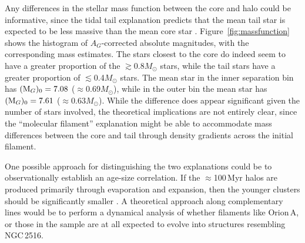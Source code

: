 \documentclass[12pt,twocolumn,tighten]{aastex63}
\newcommand{\cn}{NGC\,2516} %
\begin{document}
Any differences in the stellar mass function between the core and halo
could be informative, since the tidal tail explanation predicts that
the mean tail star is expected to be less massive than the mean core
star \citep[{\it e.g.},][]{chumak_tails_2006}.
Figure~\ref{fig:massfunction} shows the histogram of $A_G$-corrected
absolute magnitudes, with the corresponding
\citet{pecaut_mamajek_2013} mass estimates.  The stars closest
to the core do
indeed seem to have a greater proportion of the $\gtrsim$0.8$M_\odot$
stars, while the tail stars have a greater proportion of
$\lesssim$0.4$M_\odot$ stars.  The mean star in the inner separation bin has
$({\rm M}_G)_0=7.08$ ($\approx$0.69$M_\odot$), while in the outer bin
the mean star has $({\rm M}_G)_0=7.61$ ($\approx$0.63$M_\odot$).
While the difference does appear significant given the number of
stars involved, the theoretical implications are not entirely clear,
since the ``molecular filament'' explanation might be able to
accommodate mass differences between the core and tail through density
gradients across the initial filament.

One possible approach for distinguishing the two explanations could be
to observationally establish an age-size correlation.  If the
$\approx$100\,Myr halos are produced primarily through evaporation and
expansion, then the younger clusters should be significantly smaller
\citep{chumak_tails_2006,chumak_realOCs_2006}.  A theoretical approach
along complementary lines would be to perform a dynamical analysis of
whether filaments like Orion\,A, or those in the
\citet{zucker_physical_2018} sample are at all expected to evolve into
structures resembling \cn.
\end{document}
